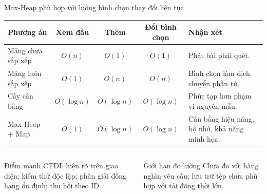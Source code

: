 \documentclass[aspectratio=169,11pt]{beamer}
\begin{document}
\begin{frame}{Max-Heap phù hợp với luồng bình chọn thay đổi liên tục}
\small
\begin{tabularx}{\textwidth}{@{}lcccX@{}}
\toprule
\textbf{Phương án} & \textbf{Xem đầu} & \textbf{Thêm} & \textbf{Đổi bình chọn} & \textbf{Nhận xét}\\
\midrule
Mảng chưa sắp xếp & $O(n)$ & $O(1)$ & $O(1)$ & Phát bài phải quét.\\
Mảng luôn sắp xếp & $O(1)$ & $O(n)$ & $O(n)$ & Bình chọn làm dịch chuyển phần tử.\\
Cây cân bằng & $O(\log n)$ & $O(\log n)$ & $O(\log n)$ & Phức tạp hơn phạm vi nguyên mẫu.\\
\alert{Max-Heap + Map} & $O(1)$ & $O(\log n)$ & $O(\log n)$ &
Cân bằng hiệu năng, bộ nhớ, khả năng minh họa.\\
\bottomrule
\end{tabularx}
\vspace{0.45cm}
\begin{columns}[T,totalwidth=\textwidth]
\begin{block}{Điểm mạnh}
CTDL hiện rõ trên giao diện; kiểm thử độc lập; phân giải đồng hạng ổn định; thu hồi theo ID.
\end{block}
\begin{block}{Giới hạn đo lường}
Chưa đo với hàng nghìn yêu cầu; lưu trữ tệp chưa phù hợp với tải đồng thời lớn.
\end{block}
\end{columns}
\end{frame}
\end{document}
